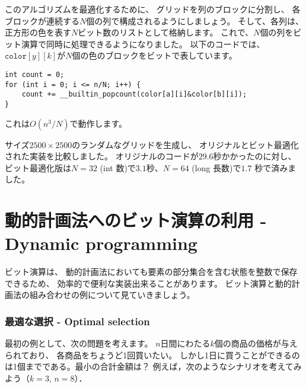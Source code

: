 このアルゴリズムを最適化するために、
グリッドを列のブロックに分割し、
各ブロックが連続する$N$個の列で構成されるようにしましょう。
そして、各列は、正方形の色を表す$N$ビット数のリストとして格納します。
これで、$N$個の列をビット演算で同時に処理できるようになりました。
以下のコードでは、$\texttt{color}[y][k]$が$N$個の色のブロックをビットで表しています。

\begin{lstlisting}
int count = 0;
for (int i = 0; i <= n/N; i++) {
    count += __builtin_popcount(color[a][i]&color[b][i]);
}
\end{lstlisting}
これは$O(n^3/N)$で動作します。

サイズ$2500 \times 2500$のランダムなグリッドを生成し、
オリジナルとビット最適化された実装を比較しました。
オリジナルのコードが$29.6$秒かかったのに対し、
ビット最適化版は$N = 32$ (int 数)で$3.1$秒、$N = 64$ (long 長数)で$1.7$ 秒で済みました。

\section{動的計画法へのビット演算の利用 - Dynamic programming}

ビット演算は、
動的計画法においても要素の部分集合を含む状態を整数で保存できるため、
効率的で便利な実装出来ることがあります。
ビット演算と動的計画法の組み合わせの例について見ていきましょう。

\subsubsection{最適な選択 - Optimal selection}

最初の例として、次の問題を考えます。
$n$日間にわたる$k$個の商品の価格が与えられており、
各商品をちょうど1回買いたい。
しかし1日に買うことができるのは1個までである。最小の合計金額は？
例えば，次のようなシナリオを考えてみよう（$k = 3$, $n = 8$）．

